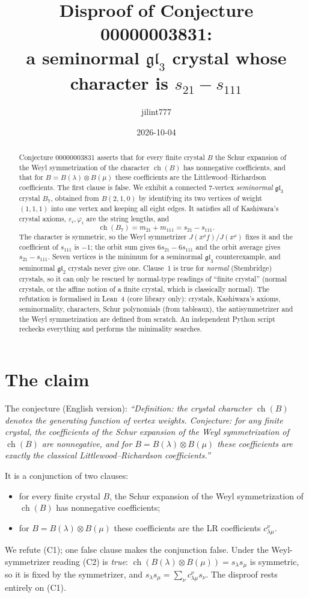 \documentclass[11pt]{article}
\title{Disproof of Conjecture 00000003831:\\
a seminormal $\mathfrak{gl}_3$ crystal whose character is $s_{21}-s_{111}$}
\author{jilint777}
\date{2026-10-04}
\theoremstyle{definition}
\theoremstyle{remark}
\newcommand{\ch}{\operatorname{ch}}
\begin{document}
\sloppy
\maketitle

\begin{abstract}
Conjecture 00000003831 asserts that for every finite crystal $B$ the Schur expansion of the
Weyl symmetrization of the character $\ch(B)$ has nonnegative coefficients, and that for
$B=B(\lambda)\otimes B(\mu)$ these coefficients are the Littlewood--Richardson coefficients.
The first clause is false. We exhibit a connected $7$-vertex \emph{seminormal} $\mathfrak{gl}_3$
crystal $B_7$, obtained from $B(2,1,0)$ by identifying its two vertices of weight $(1,1,1)$
into one vertex and keeping all eight edges. It satisfies all of Kashiwara's crystal axioms,
$\varepsilon_i,\varphi_i$ are the string lengths, and
\[
\ch(B_7)=m_{21}+m_{111}=s_{21}-s_{111}.
\]
The character is symmetric, so the Weyl symmetrizer $J(x^\rho f)/J(x^\rho)$ fixes it and the
coefficient of $s_{111}$ is $-1$; the orbit sum gives $6s_{21}-6s_{111}$ and the orbit average
gives $s_{21}-s_{111}$. Seven vertices is the minimum for a seminormal $\mathfrak{gl}_3$
counterexample, and seminormal $\mathfrak{gl}_2$ crystals never give one. Clause~1 is true for
\emph{normal} (Stembridge) crystals, so it can only be rescued by normal-type readings of
``finite crystal'' (normal crystals, or the affine notion of a finite crystal, which is
classically normal). The refutation is formalised in Lean~4 (core library only): crystals,
Kashiwara's axioms, seminormality, characters, Schur polynomials (from tableaux), the
antisymmetrizer and the Weyl symmetrization are defined from scratch. An independent Python
script rechecks everything and performs the minimality searches.
\end{abstract}

\section{The claim}

The conjecture (English version): \emph{``Definition: the crystal character $\ch(B)$ denotes the
generating function of vertex weights. Conjecture: for any finite crystal, the coefficients of the
Schur expansion of the Weyl symmetrization of $\ch(B)$ are nonnegative, and for
$B=B(\lambda)\otimes B(\mu)$ these coefficients are exactly the classical Littlewood--Richardson
coefficients.''}

It is a conjunction of two clauses:
\begin{itemize}
\item[(C1)] for every finite crystal $B$, the Schur expansion of the Weyl symmetrization of
$\ch(B)$ has nonnegative coefficients;
\item[(C2)] for $B=B(\lambda)\otimes B(\mu)$ these coefficients are the LR coefficients
$c^\nu_{\lambda\mu}$.
\end{itemize}
We refute (C1); one false clause makes the conjunction false. Under the Weyl-symmetrizer reading
(C2) is \emph{true}: $\ch(B(\lambda)\otimes B(\mu))=s_\lambda s_\mu$ is symmetric, so it is fixed
by the symmetrizer, and $s_\lambda s_\mu=\sum_\nu c^\nu_{\lambda\mu}s_\nu$. The disproof rests
entirely on (C1).
\end{document}
